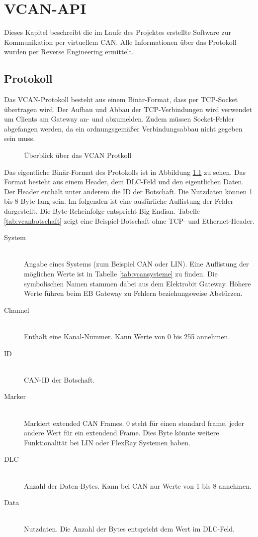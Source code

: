\chapter{VCAN-API}
\label{sec:vcan_api}
Dieses Kapitel beschreibt die im Laufe des Projektes erstellte Software zur Kommunikation per virtuellem CAN. Alle Informationen über das Protokoll wurden per Reverse Engineering ermittelt.

\section{Protokoll}
\label{sec:vcan_protokoll}
Das VCAN-Protokoll besteht aus einem Binär-Format, dass per TCP-Socket übertragen wird. Der Aufbau und Abbau der TCP-Verbindungen wird verwendet um Clients am Gateway an- und abzumelden. Zudem müssen Socket-Fehler abgefangen werden, da ein ordnungsgemäßer Verbindungsabbau nicht gegeben sein muss.

\begin{figure}[ht]
    \centering
    
    \caption{Überblick über das VCAN Protkoll}
    \label{fig:vcan_protokoll}
\end{figure}

Das eigentliche Binär-Format des Protokolls ist in Abbildung \ref{fig:vcan_protokoll} zu sehen. Das Format besteht aus einem Header, dem DLC-Feld und den eigentlichen Daten. Der Header enthält unter anderem die ID der Botschaft. Die Nutzdaten können 1 bis 8 Byte lang sein. Im folgenden ist eine ausfürliche Auflistung der Felder dargestellt. Die Byte-Reheinfolge entspricht Big-Endian. Tabelle \ref{tab:vcanbotschaft} zeigt eine Beispiel-Botschaft ohne TCP- und Ethernet-Header.

\begin{description}
    \item[System] \hfill \\ Angabe eines Systems (zum Beispiel CAN oder LIN). Eine Auflistung der möglichen Werte ist in Tabelle \ref{tab:vcansysteme} zu finden. Die symbolischen Namen stammen dabei aus dem Elektrobit Gateway. Höhere Werte führen beim EB Gateway zu Fehlern beziehungsweise Abstürzen.
    \item[Channel] \hfill \\ Enthält eine Kanal-Nummer. Kann Werte von 0 bis 255 annehmen.
    \item[ID] \hfill \\ CAN-ID der Botschaft.
    \item[Marker] \hfill \\ Markiert extended CAN Frames. 0 steht für einen standard frame, jeder andere Wert für ein extendend Frame. Dies Byte könnte weitere Funktionalität bei LIN oder FlexRay Systemen haben.
    \item[DLC] \hfill \\ Anzahl der Daten-Bytes. Kann bei CAN nur Werte von 1 bis 8 annehmen. 
    \item[Data] \hfill \\ Nutzdaten. Die Anzahl der Bytes entspricht dem Wert im DLC-Feld.
\end{description}

